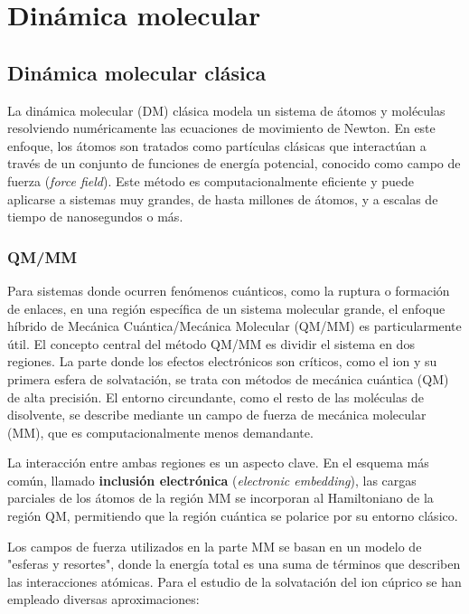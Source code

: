 \chapter{Dinámica molecular}


\section{Dinámica molecular clásica}

La dinámica molecular (DM) clásica modela un sistema de átomos y moléculas resolviendo numéricamente las ecuaciones de movimiento de Newton. En este enfoque, los átomos son tratados como partículas clásicas que interactúan a través de un conjunto de funciones de energía potencial, conocido como campo de fuerza (\textit{force field}). Este método es computacionalmente eficiente y puede aplicarse a sistemas muy grandes, de hasta millones de átomos, y a escalas de tiempo de nanosegundos o más.

\subsection{QM/MM}

Para sistemas donde ocurren fenómenos cuánticos, como la ruptura o formación de enlaces, en una región específica de un sistema molecular grande, el enfoque híbrido de Mecánica Cuántica/Mecánica Molecular (QM/MM) es particularmente útil. El concepto central del método QM/MM es dividir el sistema en dos regiones. La parte donde los efectos electrónicos son críticos, como el ion  y su primera esfera de solvatación, se trata con métodos de mecánica cuántica (QM) de alta precisión. El entorno circundante, como el resto de las moléculas de disolvente, se describe mediante un campo de fuerza de mecánica molecular (MM), que es computacionalmente menos demandante.

La interacción entre ambas regiones es un aspecto clave. En el esquema más común, llamado \textbf{inclusión electrónica} (\textit{electronic embedding}), las cargas parciales de los átomos de la región MM se incorporan al Hamiltoniano de la región QM, permitiendo que la región cuántica se polarice por su entorno clásico.

Los campos de fuerza utilizados en la parte MM se basan en un modelo de "esferas y resortes", donde la energía total es una suma de términos que describen las interacciones atómicas. Para el estudio de la solvatación del ion cúprico se han empleado diversas aproximaciones:

